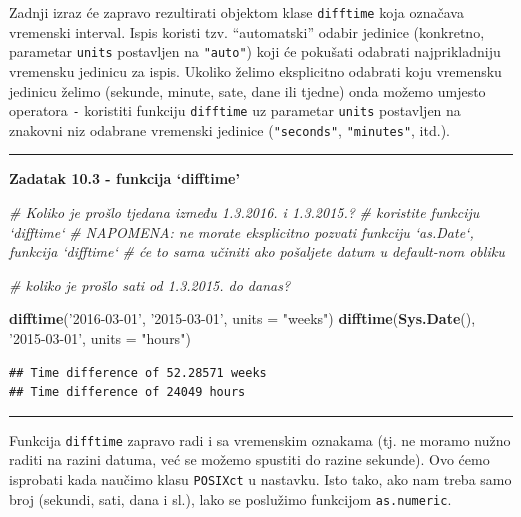 \documentclass[]{book}
\newenvironment{Shaded}{\begin{snugshade}}{\end{snugshade}}
\newcommand{\KeywordTok}[1]{\textcolor[rgb]{0.13,0.29,0.53}{\textbf{#1}}}
\newcommand{\DataTypeTok}[1]{\textcolor[rgb]{0.13,0.29,0.53}{#1}}
\newcommand{\StringTok}[1]{\textcolor[rgb]{0.31,0.60,0.02}{#1}}
\newcommand{\CommentTok}[1]{\textcolor[rgb]{0.56,0.35,0.01}{\textit{#1}}}
\newcommand{\NormalTok}[1]{#1}
\theoremstyle{definition}
\theoremstyle{definition}
\theoremstyle{definition}
\theoremstyle{remark}
\begin{document}
Zadnji izraz će zapravo rezultirati objektom klase \texttt{difftime}
koja označava vremenski interval. Ispis koristi tzv. ``automatski''
odabir jedinice (konkretno, parametar \texttt{units} postavljen na
\texttt{"auto"}) koji će pokušati odabrati najprikladniju vremensku
jedinicu za ispis. Ukoliko želimo eksplicitno odabrati koju vremensku
jedinicu želimo (sekunde, minute, sate, dane ili tjedne) onda možemo
umjesto operatora \texttt{-} koristiti funkciju \texttt{difftime} uz
parametar \texttt{units} postavljen na znakovni niz odabrane vremenski
jedinice (\texttt{"seconds"}, \texttt{"minutes"}, itd.).

\begin{center}\rule{0.5\linewidth}{\linethickness}\end{center}

\textbf{Zadatak 10.3 - funkcija `difftime'}

\begin{Shaded}
\begin{Highlighting}[]
\CommentTok{# Koliko je prošlo tjedana između 1.3.2016. i 1.3.2015.?}
\CommentTok{# koristite funkciju `difftime`}
\CommentTok{# NAPOMENA: ne morate eksplicitno pozvati funkciju `as.Date`, funkcija `difftime`}
\CommentTok{#       će to sama učiniti ako pošaljete datum u default-nom obliku}

\CommentTok{# koliko je prošlo sati od 1.3.2015. do danas?}
\end{Highlighting}
\end{Shaded}

\begin{Shaded}
\begin{Highlighting}[]
\KeywordTok{difftime}\NormalTok{(}\StringTok{'2016-03-01'}\NormalTok{, }\StringTok{'2015-03-01'}\NormalTok{, }\DataTypeTok{units =} \StringTok{"weeks"}\NormalTok{)}
\KeywordTok{difftime}\NormalTok{(}\KeywordTok{Sys.Date}\NormalTok{(), }\StringTok{'2015-03-01'}\NormalTok{, }\DataTypeTok{units =} \StringTok{"hours"}\NormalTok{)}
\end{Highlighting}
\end{Shaded}

\begin{verbatim}
## Time difference of 52.28571 weeks
## Time difference of 24049 hours
\end{verbatim}

\begin{center}\rule{0.5\linewidth}{\linethickness}\end{center}

Funkcija \texttt{difftime} zapravo radi i sa vremenskim oznakama (tj. ne
moramo nužno raditi na razini datuma, već se možemo spustiti do razine
sekunde). Ovo ćemo isprobati kada naučimo klasu \texttt{POSIXct} u
nastavku. Isto tako, ako nam treba samo broj (sekundi, sati, dana i
sl.), lako se poslužimo funkcijom \texttt{as.numeric}.
\end{document}
